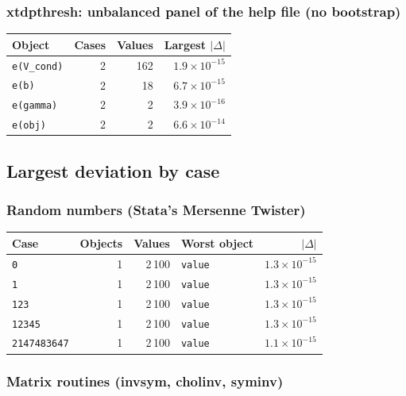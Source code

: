 \documentclass[
  10.5pt,
  a4paper,
]{article}
\begin{document}
\subsubsection*{xtdpthresh: unbalanced panel of the help file (no bootstrap)}

\begin{longtable}{@{}p{8.2cm}rrr@{}}
\toprule
Object & Cases & Values & Largest $|\Delta|$ \\
\midrule
\endhead
\texttt{e(V\_\allowbreak{}cond)} & 2 & 162 & $1.9\times10^{-15}$ \\
\texttt{e(b)} & 2 & 18 & $6.7\times10^{-15}$ \\
\texttt{e(gamma)} & 2 & 2 & $3.9\times10^{-16}$ \\
\texttt{e(obj)} & 2 & 2 & $6.6\times10^{-14}$ \\
\bottomrule
\end{longtable}

\subsection{Largest deviation by case}

\subsubsection*{Random numbers (Stata's Mersenne Twister)}

\begin{longtable}{@{}p{3.6cm}rrp{4.9cm}r@{}}
\toprule
Case & Objects & Values & Worst object & $|\Delta|$ \\
\midrule
\endhead
\texttt{0} & 1 & 2\,100 & \texttt{value} & $1.3\times10^{-15}$ \\
\texttt{1} & 1 & 2\,100 & \texttt{value} & $1.3\times10^{-15}$ \\
\texttt{123} & 1 & 2\,100 & \texttt{value} & $1.3\times10^{-15}$ \\
\texttt{12345} & 1 & 2\,100 & \texttt{value} & $1.3\times10^{-15}$ \\
\texttt{2147483647} & 1 & 2\,100 & \texttt{value} & $1.1\times10^{-15}$ \\
\bottomrule
\end{longtable}

\subsubsection*{Matrix routines (invsym, cholinv, syminv)}
\end{document}
